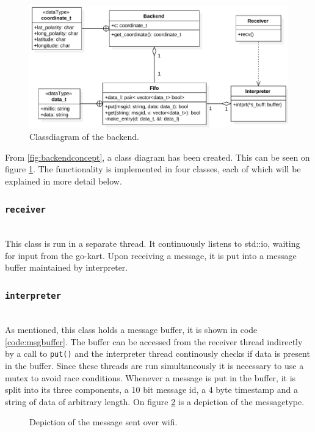 \begin{figure}[H]
	\includegraphics[width=\linewidth]{graphics/backend_class_diagram}
	\caption[Backend class diagram.]{Classdiagram of the backend.}
	\label{fig:backendclass}
\end{figure}

From \ref{fig:backendconcept}, a class diagram has been created.
This can be seen on figure \ref{fig:backendclass}.
The functionality is implemented in four classes, each of which will be explained in more detail below.

\subsubsection{\texttt{receiver}}~\\
This class is run in a separate thread.
It continuously listens to std::io, waiting for input from the go-kart.
Upon receiving a message, it is put into a message buffer maintained by interpreter.
\subsubsection{\texttt{interpreter}}~\\
As mentioned, this class holds a message buffer, it is shown in code \ref{code:msgbuffer}.
The buffer can be accessed from the receiver thread indirectly by a call to \texttt{put()} and the interpreter thread continously checks if data is present in the buffer.
Since these threads are run simultaneously it is necessary to use a mutex to avoid race conditions.
Whenever a message is put in the buffer, it is split into its three components, a 10 bit message id, a 4 byte timestamp and a string of data of arbitrary length.
On figure \ref{fig:backendmsg} is a depiction of the messagetype.
\begin{figure}[H]
	\caption[Wifi Message.]{Depiction of the message sent over wifi.}
	\label{fig:backendmsg}
\end{figure}

